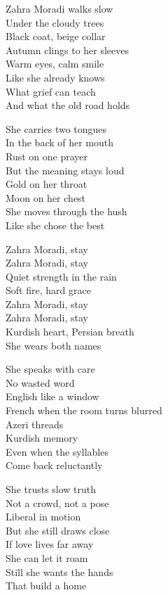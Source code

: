 \begin{lyrics}
Zahra Moradi walks slow\\
Under the cloudy trees\\
Black coat, beige collar\\
Autumn clings to her sleeves\\
Warm eyes, calm smile\\
Like she already knows\\
What grief can teach\\
And what the old road holds

She carries two tongues\\
In the back of her mouth\\
Rust on one prayer\\
But the meaning stays loud\\
Gold on her throat\\
Moon on her chest\\
She moves through the hush\\
Like she chose the best

Zahra Moradi, stay\\
Zahra Moradi, stay\\
Quiet strength in the rain\\
Soft fire, hard grace\\
Zahra Moradi, stay\\
Zahra Moradi, stay\\
Kurdish heart, Persian breath\\
She wears both names

She speaks with care\\
No wasted word\\
English like a window\\
French when the room turns blurred\\
Azeri threads\\
Kurdish memory\\
Even when the syllables\\
Come back reluctantly

She trusts slow truth\\
Not a crowd, not a pose\\
Liberal in motion\\
But she still draws close\\
If love lives far away\\
She can let it roam\\
Still she wants the hands\\
That build a home


\end{lyrics}

